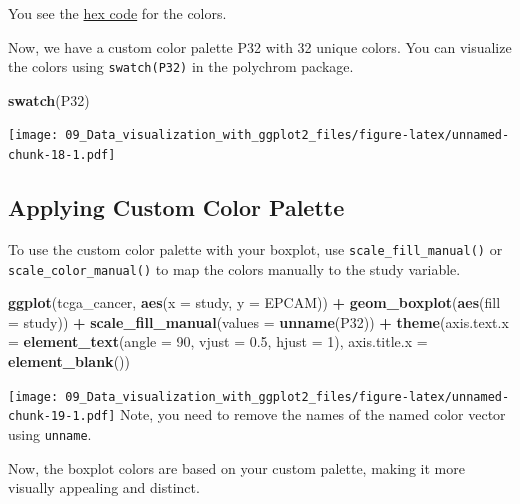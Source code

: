 \documentclass[
]{book}
\newenvironment{Shaded}{\begin{snugshade}}{\end{snugshade}}
\newcommand{\AttributeTok}[1]{\textcolor[rgb]{0.13,0.29,0.53}{#1}}
\newcommand{\DecValTok}[1]{\textcolor[rgb]{0.00,0.00,0.81}{#1}}
\newcommand{\FloatTok}[1]{\textcolor[rgb]{0.00,0.00,0.81}{#1}}
\newcommand{\FunctionTok}[1]{\textcolor[rgb]{0.13,0.29,0.53}{\textbf{#1}}}
\newcommand{\NormalTok}[1]{#1}
\newcommand{\SpecialCharTok}[1]{\textcolor[rgb]{0.81,0.36,0.00}{\textbf{#1}}}
\begin{document}
You see the \href{https://en.wikipedia.org/wiki/Web_colors}{hex code} for the colors.

Now, we have a custom color palette P32 with 32 unique colors. You can visualize the colors using \texttt{swatch(P32)} in the polychrom package.

\begin{Shaded}
\begin{Highlighting}[]
\FunctionTok{swatch}\NormalTok{(P32)}
\end{Highlighting}
\end{Shaded}

\texttt{[image: 09\_Data\_visualization\_with\_ggplot2\_files/figure-latex/unnamed-chunk-18-1.pdf]}

\hypertarget{applying-custom-color-palette}{%
\subsection{Applying Custom Color Palette}\label{applying-custom-color-palette}}

To use the custom color palette with your boxplot, use \texttt{scale\_fill\_manual()} or \texttt{scale\_color\_manual()} to map the colors manually to the study variable.

\begin{Shaded}
\begin{Highlighting}[]
\FunctionTok{ggplot}\NormalTok{(tcga\_cancer, }\FunctionTok{aes}\NormalTok{(}\AttributeTok{x =}\NormalTok{ study, }\AttributeTok{y =}\NormalTok{ EPCAM)) }\SpecialCharTok{+}
  \FunctionTok{geom\_boxplot}\NormalTok{(}\FunctionTok{aes}\NormalTok{(}\AttributeTok{fill =}\NormalTok{ study)) }\SpecialCharTok{+}
  \FunctionTok{scale\_fill\_manual}\NormalTok{(}\AttributeTok{values =} \FunctionTok{unname}\NormalTok{(P32)) }\SpecialCharTok{+}
  \FunctionTok{theme}\NormalTok{(}\AttributeTok{axis.text.x =} \FunctionTok{element\_text}\NormalTok{(}\AttributeTok{angle =} \DecValTok{90}\NormalTok{, }\AttributeTok{vjust =} \FloatTok{0.5}\NormalTok{, }\AttributeTok{hjust =} \DecValTok{1}\NormalTok{),}
        \AttributeTok{axis.title.x =} \FunctionTok{element\_blank}\NormalTok{())}
\end{Highlighting}
\end{Shaded}

\texttt{[image: 09\_Data\_visualization\_with\_ggplot2\_files/figure-latex/unnamed-chunk-19-1.pdf]}
Note, you need to remove the names of the named color vector using \texttt{unname}.

Now, the boxplot colors are based on your custom palette, making it more visually appealing and distinct.
\end{document}
